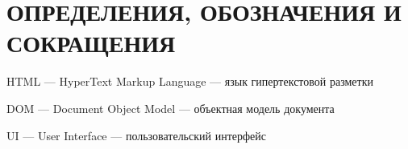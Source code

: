 \section*{ОПРЕДЕЛЕНИЯ, ОБОЗНАЧЕНИЯ И СОКРАЩЕНИЯ}

HTML --- HyperText Markup Language --- язык гипертекстовой разметки

DOM --- Document Object Model --- объектная модель документа

UI --- User Interface --- пользовательский интерфейс



\pagebreak